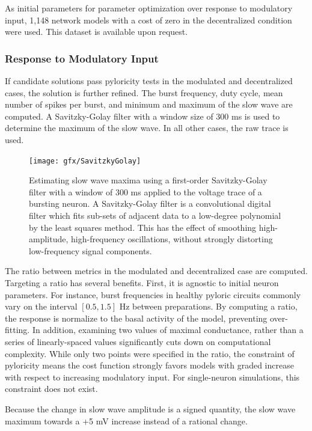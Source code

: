 As initial parameters for parameter optimization over response to modulatory input, 1,148 network models with a cost of zero in the decentralized condition were used. This dataset is available upon request.

\subsubsection{Response to Modulatory Input}
If candidate solutions pass pyloricity tests in the modulated and decentralized cases, the solution is further refined. The burst frequency, duty cycle, mean number of spikes per burst, and minimum and maximum of the slow wave are computed. A Savitzky-Golay filter with a window size of 300 ms is used to determine the maximum of the slow wave. In all other cases, the raw trace is used.

\begin{figure}[h]
	\centering
	\texttt{[image: gfx/SavitzkyGolay]}
	\caption[Savitzky-Golay filter visualizes slow wave]{Estimating slow wave maxima using a first-order Savitzky-Golay filter with a window of 300 ms applied to the voltage trace of a bursting neuron. A Savitzky-Golay filter is a convolutional digital filter which fits sub-sets of adjacent data to a low-degree polynomial by the least squares method. This has the effect of smoothing high-amplitude, high-frequency oscillations, without strongly distorting low-frequency signal components\autocite{SavitzkySmoothingDifferentiationData1964}.}
	\label{fig:savitzkygolay}
\end{figure}


The ratio between metrics in the modulated and decentralized case are computed. Targeting a ratio has several benefits. First, it is agnostic to initial neuron parameters. For instance, burst frequencies in healthy pyloric circuits commonly vary on the interval $[0.5, 1.5]$ Hz between preparations\autocite{MarderUnderstandingCircuitDynamics2007}. By computing a ratio, the response is normalize to the basal activity of the model, preventing over-fitting. In addition, examining two values of maximal conductance, rather than a series of linearly-spaced values significantly cuts down on computational complexity. While only two points were specified in the ratio, the constraint of pyloricity means the cost function strongly favors models with graded increase with respect to increasing modulatory input. For single-neuron simulations, this constraint does not exist.

Because the change in slow wave amplitude is a signed quantity, the slow wave maximum towards a +5 mV increase instead of a rational change.

